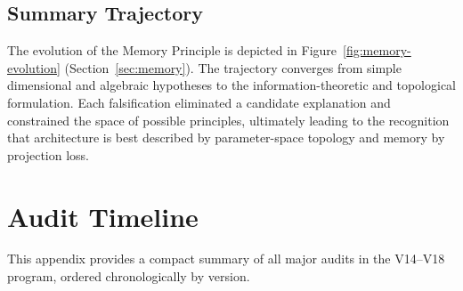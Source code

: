 \documentclass[11pt,a4paper,oneside]{report}
\begin{document}
\begin{appendices}
\begin{description}[leftmargin=*, itemsep=8pt]
\end{description}

\section{Summary Trajectory}

The evolution of the Memory Principle is depicted in Figure~\ref{fig:memory-evolution}
(Section~\ref{sec:memory}). The trajectory converges from simple dimensional and
algebraic hypotheses to the information-theoretic and topological formulation.
Each falsification eliminated a candidate explanation and constrained the space of
possible principles, ultimately leading to the recognition that architecture is best
described by parameter-space topology and memory by projection loss.

\chapter{Audit Timeline}

This appendix provides a compact summary of all major audits in the V14--V18
program, ordered chronologically by version.


\end{appendices}
\end{document}
